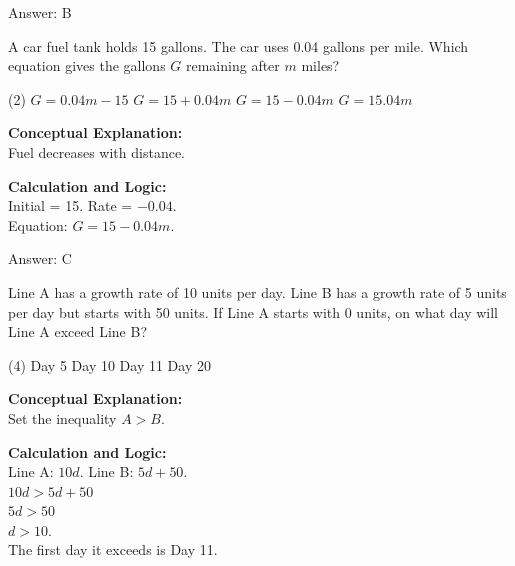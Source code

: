 \documentclass[11pt,paper=a4,answers]{exam}
\begin{document}
\begin{questions}
\begin{solution}
\vspace{15pt}
Answer: \colorbox{yellow!100}{B}
\end{solution}

\vspace{20pt}

\question
A car fuel tank holds 15 gallons. The car uses 0.04 gallons per mile. Which equation gives the gallons $G$ remaining after $m$ miles?
\begin{tasks}(2)
    \task $G = 0.04m - 15$
    \task $G = 15 + 0.04m$
    \task $G = 15 - 0.04m$
    \task $G = 15.04m$
\end{tasks}

\begin{solution}
\textbf{Conceptual Explanation:} \\
Fuel decreases with distance.

\vspace{10pt}
\textbf{Calculation and Logic:} \\
Initial = 15. Rate = $-0.04$. \\
Equation: $G = 15 - 0.04m$.

\vspace{15pt}
Answer: \colorbox{yellow!100}{C}
\end{solution}

\vspace{20pt}

\question

Line A has a growth rate of 10 units per day. Line B has a growth rate of 5 units per day but starts with 50 units. If Line A starts with 0 units, on what day will Line A exceed Line B?
\begin{tasks}(4)
    \task Day 5
    \task Day 10
    \task Day 11
    \task Day 20
\end{tasks}

\begin{solution}
\textbf{Conceptual Explanation:} \\
Set the inequality $A > B$.

\vspace{10pt}
\textbf{Calculation and Logic:} \\
Line A: $10d$. Line B: $5d + 50$. \\
$10d > 5d + 50$ \\
$5d > 50$ \\
$d > 10$. \\
The first day it exceeds is Day 11.


\end{solution}
\end{questions}
\end{document}

